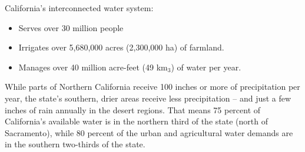 \documentclass{article}
\begin{document}
California's interconnected water system:
\begin{itemize}
\item Serves over 30 million people
\item Irrigates over 5,680,000 acres (2,300,000 ha) of farmland.
\item Manages over 40 million acre-feet (49 km$_3$) of water per year.
\end{itemize}

While parts of Northern California receive 100 inches or more of precipitation per year, the state’s southern, drier areas receive less precipitation – and just a few inches of rain annually in the desert regions. That means 75 percent of California’s available water is in the northern third of the state (north of Sacramento), while 80 percent of the urban and agricultural water demands are in the southern two-thirds of the state.
\end{document}
